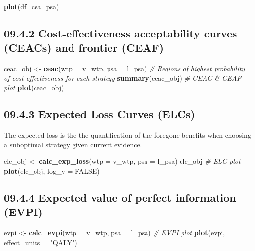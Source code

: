 \documentclass[
]{article}
\newenvironment{Shaded}{\begin{snugshade}}{\end{snugshade}}
\newcommand{\CommentTok}[1]{\textcolor[rgb]{0.56,0.35,0.01}{\textit{#1}}}
\newcommand{\DataTypeTok}[1]{\textcolor[rgb]{0.13,0.29,0.53}{#1}}
\newcommand{\KeywordTok}[1]{\textcolor[rgb]{0.13,0.29,0.53}{\textbf{#1}}}
\newcommand{\NormalTok}[1]{#1}
\newcommand{\OtherTok}[1]{\textcolor[rgb]{0.56,0.35,0.01}{#1}}
\newcommand{\StringTok}[1]{\textcolor[rgb]{0.31,0.60,0.02}{#1}}
\begin{document}
\begin{Shaded}
\begin{Highlighting}[]
\KeywordTok{plot}\NormalTok{(df_cea_psa)}
\end{Highlighting}
\end{Shaded}

\hypertarget{cost-effectiveness-acceptability-curves-ceacs-and-frontier-ceaf}{%
\subsection{09.4.2 Cost-effectiveness acceptability curves (CEACs) and
frontier
(CEAF)}\label{cost-effectiveness-acceptability-curves-ceacs-and-frontier-ceaf}}

\begin{Shaded}
\begin{Highlighting}[]
\NormalTok{ceac_obj <-}\StringTok{ }\KeywordTok{ceac}\NormalTok{(}\DataTypeTok{wtp =}\NormalTok{ v_wtp, }\DataTypeTok{psa =}\NormalTok{ l_psa)}
\CommentTok{# Regions of highest probability of cost-effectiveness for each strategy}
\KeywordTok{summary}\NormalTok{(ceac_obj)}
\CommentTok{# CEAC & CEAF plot}
\KeywordTok{plot}\NormalTok{(ceac_obj)}
\end{Highlighting}
\end{Shaded}

\hypertarget{expected-loss-curves-elcs}{%
\subsection{09.4.3 Expected Loss Curves
(ELCs)}\label{expected-loss-curves-elcs}}

The expected loss is the the quantification of the foregone benefits
when choosing a suboptimal strategy given current evidence.

\begin{Shaded}
\begin{Highlighting}[]
\NormalTok{elc_obj <-}\StringTok{ }\KeywordTok{calc_exp_loss}\NormalTok{(}\DataTypeTok{wtp =}\NormalTok{ v_wtp, }\DataTypeTok{psa =}\NormalTok{ l_psa)}
\NormalTok{elc_obj}
\CommentTok{# ELC plot}
\KeywordTok{plot}\NormalTok{(elc_obj, }\DataTypeTok{log_y =} \OtherTok{FALSE}\NormalTok{)}
\end{Highlighting}
\end{Shaded}

\hypertarget{expected-value-of-perfect-information-evpi}{%
\subsection{09.4.4 Expected value of perfect information
(EVPI)}\label{expected-value-of-perfect-information-evpi}}

\begin{Shaded}
\begin{Highlighting}[]
\NormalTok{evpi <-}\StringTok{ }\KeywordTok{calc_evpi}\NormalTok{(}\DataTypeTok{wtp =}\NormalTok{ v_wtp, }\DataTypeTok{psa =}\NormalTok{ l_psa)}
\CommentTok{# EVPI plot}
\KeywordTok{plot}\NormalTok{(evpi, }\DataTypeTok{effect_units =} \StringTok{"QALY"}\NormalTok{)}
\end{Highlighting}
\end{Shaded}
\end{document}
